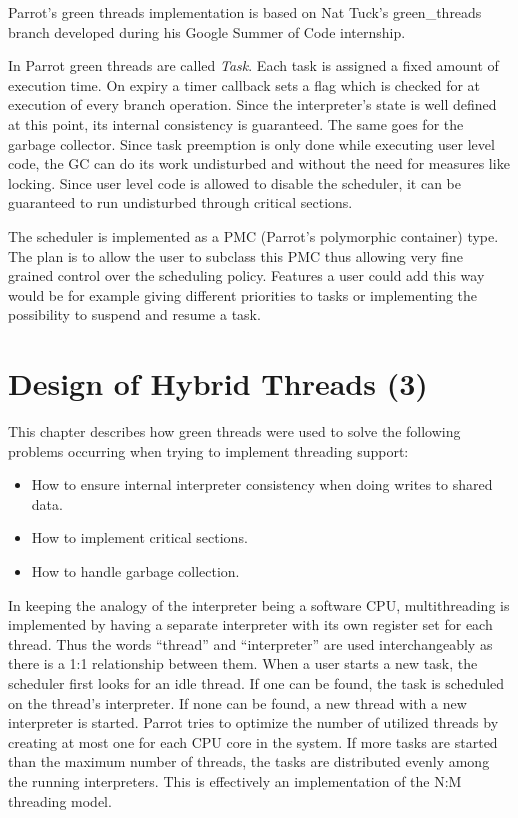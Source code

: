 \documentclass[bachelor,english]{hgbthesis}
\begin{document}
Parrot's green threads implementation is based on Nat Tuck's green\_threads branch developed during his Google Summer of Code internship.

In Parrot green threads are called \textit{Task}. Each task is assigned a fixed amount of execution time. On expiry a timer callback sets a flag which is checked for at execution of every branch operation. Since the interpreter's state is well defined at this point, its internal consistency is guaranteed. The same goes for the garbage collector. Since task preemption is only done while executing user level code, the GC can do its work undisturbed and without the need for measures like locking. Since user level code is allowed to disable the scheduler, it can be guaranteed to run undisturbed through critical sections.

The scheduler is implemented as a PMC (Parrot's polymorphic container) type. The plan is to allow the user to subclass this PMC thus allowing very fine grained control over the scheduling policy. Features a user could add this way would be for example giving different priorities to tasks or implementing the possibility to suspend and resume a task.

\chapter{Design of Hybrid Threads (3)}
\label{cha:design}

This chapter describes how green threads were used to solve the following problems occurring when trying to implement threading support:
%
\begin{itemize}
\item How to ensure internal interpreter consistency when doing writes to shared data.
\item How to implement critical sections.
\item How to handle garbage collection.
\end{itemize}

In keeping the analogy of the interpreter being a software CPU, multithreading is implemented by having a separate interpreter with its own register set for each thread. Thus the words ``thread'' and ``interpreter'' are used interchangeably as there is a 1:1 relationship between them. When a user starts a new task, the scheduler first looks for an idle thread. If one can be found, the task is scheduled on the thread's interpreter. If none can be found, a new thread with a new interpreter is started. Parrot tries to optimize the number of utilized threads by creating at most one for each CPU core in the system. If more tasks are started than the maximum number of threads, the tasks are distributed evenly among the running interpreters. This is effectively an implementation of the N:M threading model.
\end{document}
